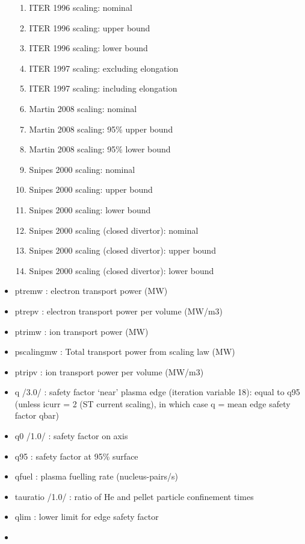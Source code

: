 \documentclass[]{article}
\begin{document}
\begin{itemize}
  \begin{enumerate}
  \itemsep1pt\parskip0pt
  \item
    ITER 1996 scaling: nominal
  \item
    ITER 1996 scaling: upper bound
  \item
    ITER 1996 scaling: lower bound
  \item
    ITER 1997 scaling: excluding elongation
  \item
    ITER 1997 scaling: including elongation
  \item
    Martin 2008 scaling: nominal
  \item
    Martin 2008 scaling: 95\% upper bound
  \item
    Martin 2008 scaling: 95\% lower bound
  \item
    Snipes 2000 scaling: nominal
  \item
    Snipes 2000 scaling: upper bound
  \item
    Snipes 2000 scaling: lower bound
  \item
    Snipes 2000 scaling (closed divertor): nominal
  \item
    Snipes 2000 scaling (closed divertor): upper bound
  \item
    Snipes 2000 scaling (closed divertor): lower bound
  \end{enumerate}
\item
  ptremw : electron transport power (MW)
\item
  ptrepv : electron transport power per volume (MW/m3)
\item
  ptrimw : ion transport power (MW)
\item
  pscalingmw : Total transport power from scaling law (MW)
\item
  ptripv : ion transport power per volume (MW/m3)
\item
  q /3.0/ : safety factor `near' plasma edge (iteration variable 18):
  equal to q95 (unless icurr = 2 (ST current scaling), in which case q =
  mean edge safety factor qbar)
\item
  q0 /1.0/ : safety factor on axis
\item
  q95 : safety factor at 95\% surface
\item
  qfuel : plasma fuelling rate (nucleus-pairs/s)
\item
  tauratio /1.0/ : ratio of He and pellet particle confinement times
\item
  qlim : lower limit for edge safety factor
\item

\end{itemize}
\end{document}
